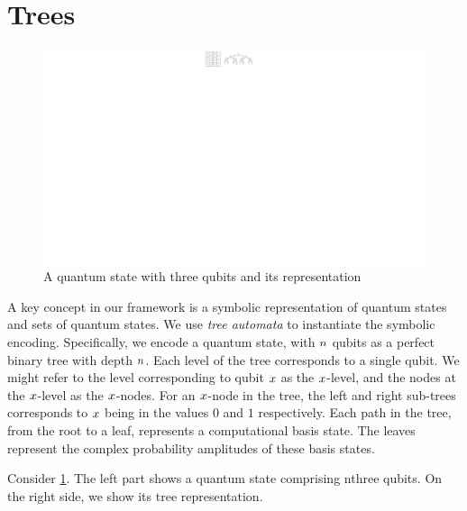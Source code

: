 \newcommand\itree[1]{\tree_{#1}}
\section{Trees}
\begin{figure}
\center
\includegraphics[]{Figures/Trees/Tree}
\caption{A quantum state with three qubits and its representation}
\label{qustate:tree:fig}
\end{figure}

A key concept in our framework is a symbolic representation of quantum states and sets of quantum states.
%
We use {\it tree automata} to instantiate the symbolic encoding.
%
Specifically, we encode a quantum state, with $n$ qubits as a perfect binary tree with depth $n$.
%
Each level of the tree corresponds to a single qubit. 
%
We might refer to the level corresponding to qubit $x$ as the $x$-level, and the nodes at the $x$-level as the $x$-nodes.
%
For an $x$-node in the tree,  the left and right sub-trees corresponds to $x$ being in the values $0$ and $1$ respectively.
%
Each path in the tree, from the root to a leaf, represents a computational basis state.
%
The leaves represent the complex probability amplitudes of these basis states.

Consider \cref{qustate:tree:fig}.
%
The left part shows a quantum state comprising nthree qubits.
%
On the right side, we show its tree representation.
%



